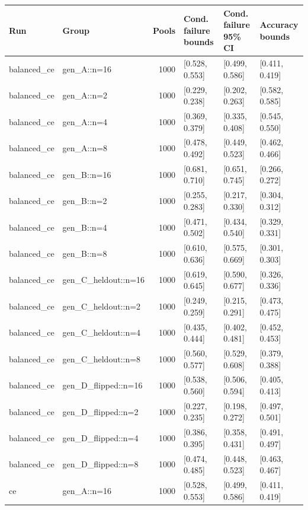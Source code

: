 \begin{tabular}{llrlll}
Run & Group & Pools & Cond. failure bounds & Cond. failure 95\% CI & Accuracy bounds \\
\hline
balanced\_ce & gen\_A::n=16 & 1000 & [0.528, 0.553] & [0.499, 0.586] & [0.411, 0.419] \\
balanced\_ce & gen\_A::n=2 & 1000 & [0.229, 0.238] & [0.202, 0.263] & [0.582, 0.585] \\
balanced\_ce & gen\_A::n=4 & 1000 & [0.369, 0.379] & [0.335, 0.408] & [0.545, 0.550] \\
balanced\_ce & gen\_A::n=8 & 1000 & [0.478, 0.492] & [0.449, 0.523] & [0.462, 0.466] \\
balanced\_ce & gen\_B::n=16 & 1000 & [0.681, 0.710] & [0.651, 0.745] & [0.266, 0.272] \\
balanced\_ce & gen\_B::n=2 & 1000 & [0.255, 0.283] & [0.217, 0.330] & [0.304, 0.312] \\
balanced\_ce & gen\_B::n=4 & 1000 & [0.471, 0.502] & [0.434, 0.540] & [0.329, 0.331] \\
balanced\_ce & gen\_B::n=8 & 1000 & [0.610, 0.636] & [0.575, 0.669] & [0.301, 0.303] \\
balanced\_ce & gen\_C\_heldout::n=16 & 1000 & [0.619, 0.645] & [0.590, 0.677] & [0.326, 0.336] \\
balanced\_ce & gen\_C\_heldout::n=2 & 1000 & [0.249, 0.259] & [0.215, 0.291] & [0.473, 0.475] \\
balanced\_ce & gen\_C\_heldout::n=4 & 1000 & [0.435, 0.444] & [0.402, 0.481] & [0.452, 0.453] \\
balanced\_ce & gen\_C\_heldout::n=8 & 1000 & [0.560, 0.577] & [0.529, 0.608] & [0.379, 0.388] \\
balanced\_ce & gen\_D\_flipped::n=16 & 1000 & [0.538, 0.560] & [0.506, 0.594] & [0.405, 0.413] \\
balanced\_ce & gen\_D\_flipped::n=2 & 1000 & [0.227, 0.235] & [0.198, 0.272] & [0.497, 0.501] \\
balanced\_ce & gen\_D\_flipped::n=4 & 1000 & [0.386, 0.395] & [0.358, 0.431] & [0.491, 0.497] \\
balanced\_ce & gen\_D\_flipped::n=8 & 1000 & [0.474, 0.485] & [0.448, 0.523] & [0.463, 0.467] \\
ce & gen\_A::n=16 & 1000 & [0.528, 0.553] & [0.499, 0.586] & [0.411, 0.419] \\

\end{tabular}
